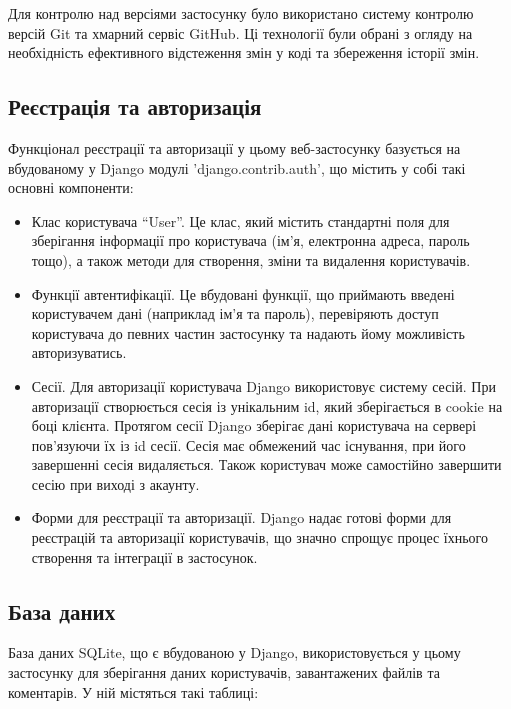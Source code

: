 \documentclass[a4paper,14pt]{extarticle}
\numberwithin{figure}{section}
\begin{document}
    Для контролю над версіями застосунку було використано систему контролю версій Git та хмарний сервіс GitHub. Ці технології були обрані з огляду на необхідність ефективного відстеження змін у коді та збереження історії змін.

    \newpage
    \subsection{\large Реєстрація та авторизація}

    Функціонал реєстрації та авторизації у цьому веб-застосунку базується на вбудованому у Django модулі 'django.contrib.auth', що містить у собі такі основні компоненти:
    \begin{itemize}
    \item Клас користувача ``User''. Це клас, який містить стандартні поля для зберігання інформації про користувача (ім'я, електронна адреса, пароль тощо), а також методи для створення, зміни та видалення користувачів.
    \item Функції автентифікації. Це вбудовані функції, що приймають введені користувачем дані (наприклад ім'я та пароль), перевіряють доступ користувача до певних частин застосунку та надають йому можливість авторизуватись.
    
    \item Сесії. Для авторизації користувача Django використовує систему сесій. При авторизації створюється сесія із унікальним id, який зберігається в cookie на боці клієнта. Протягом сесії Django зберігає дані користувача на сервері пов'язуючи їх із id сесії. Сесія має обмежений час існування, при його завершенні сесія видаляється. Також користувач може самостійно завершити сесію при виході з акаунту.
    
    \item Форми для реєстрації та авторизації. Django надає готові форми для реєстрацій та авторизації користувачів, що значно спрощує процес їхнього створення та інтеграції в застосунок.
    \end{itemize}

    
    
    \newpage
    \subsection{\large База даних}
    База даних SQLite, що є вбудованою у Django, використовується у цьому застосунку для зберігання даних користувачів, завантажених файлів та коментарів. У ній містяться такі таблиці: 
    
\end{document}
